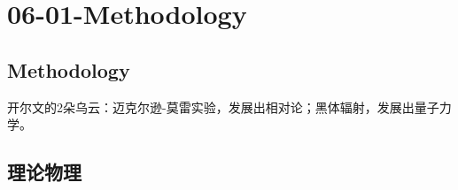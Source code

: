 

\chapter{06-01-Methodology}


\section{Methodology}


开尔文的2朵乌云：迈克尔逊-莫雷实验，发展出相对论；黑体辐射，发展出量子力学。

\section{理论物理}%

